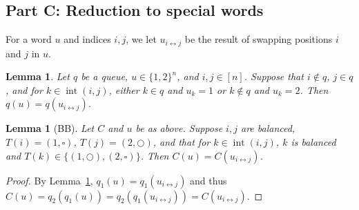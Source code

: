 \documentclass[reqno]{amsart}
\newcommand{\0}{\phantom{c}}
\DeclareMathOperator{\inter}{int} %
\theoremstyle{plain}
\newtheorem{lemma}[thm]{Lemma}
\theoremstyle{definition}
\numberwithin{equation}{section}
\begin{document}
\subsection*{Part C: Reduction to special words}

For a word $u$ and indices $i,j$, we let $u_{i\leftrightarrow j}$ be the result of swapping positions $i$ and $j$ in $u$.

\begin{lemma}
\label{le:orig}
  Let $q$ be a queue, $u \in \{1,2\}^n$, and $i,j\in [n]$. Suppose that $i \notin q$, $j\in q$, and for $k \in \inter(i,j)$, either $k \in q$ and $u_k=1$ or $k \notin q$ and $u_k = 2$. Then $q(u) = q(u_{i\leftrightarrow j})$.
\end{lemma}

\begin{lemma}[BB]
\label{le:BB}
  Let $C$ and $u$ be as above. Suppose $i,j$ are balanced, $T(i) = (1,\square)$, $T(j) = (2,\bigcirc)$, and that for $k\in\inter(i,j)$, $k$ is balanced and $T(k) \in \{(1,\bigcirc),(2,\square)\}$. Then $C(u) = C(u_{i \leftrightarrow j})$.
\end{lemma}

\begin{proof}
  By Lemma~\ref{le:orig}, $q_1(u) = q_1(u_{i\leftrightarrow j})$ and thus $C(u) = q_2(q_1(u)) = q_2(q_1(u_{i\leftrightarrow j})) = C(u_{i\leftrightarrow j})$.
\end{proof}
\end{document}
